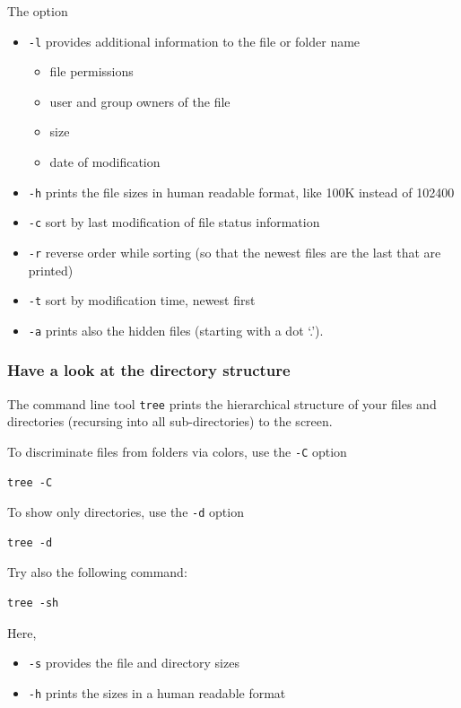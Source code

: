 \documentclass[11pt]{article}
\begin{document}
 The option
\begin{itemize}
\item \texttt{-l} provides additional information to the file or folder name
\begin{itemize}
\item file permissions
\item user and group owners of the file
\item size
\item date of modification
\end{itemize}
\item \texttt{-h} prints the file sizes in human readable format, like 100K instead of 102400
\item \texttt{-c} sort by last modification of file status information
\item \texttt{-r} reverse order while sorting (so that the newest files are the last that are printed)
\item \texttt{-t} sort by modification time, newest first
\item \texttt{-a} prints also the hidden files (starting with a dot `.').
\end{itemize}
  
\subsubsection{Have a look at the directory structure}
\label{sec-2-1-5}

The command line tool \texttt{tree} prints the hierarchical structure of your
files and directories (recursing into all sub-directories) to the screen.

 To discriminate files from folders via colors, use the \texttt{-C} option


\begin{verbatim}
tree -C
\end{verbatim}

 To show only directories, use the \texttt{-d} option


\begin{verbatim}
tree -d
\end{verbatim}

 

Try also the following command:


\begin{verbatim}
tree -sh
\end{verbatim}

Here, 
\begin{itemize}
\item \texttt{-s} provides the file and directory sizes
\item \texttt{-h} prints the sizes in a human readable format
\end{itemize}
\end{document}
